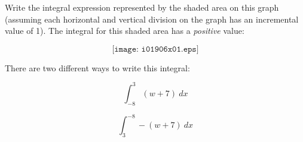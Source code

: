 

Write the integral expression represented by the shaded area on this graph (assuming each horizontal and vertical division on the graph has an incremental value of 1).  The integral for this shaded area has a {\it positive} value:

$$\texttt{[image: i01906x01.eps]}$$







There are two different ways to write this integral:

$$\int_{-8}^{3} (w + 7) \> dx$$

$$\int_{3}^{-8} -(w + 7) \> dx$$











